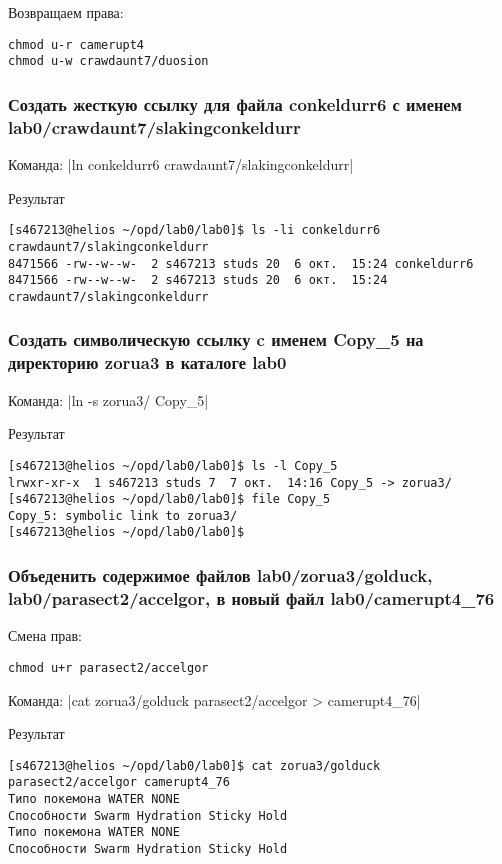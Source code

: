 Возвращаем права:
\begin{verbatim}
chmod u-r camerupt4
chmod u-w crawdaunt7/duosion
\end{verbatim}


\subsubsection*{Создать жесткую ссылку для файла conkeldurr6 с именем lab0/crawdaunt7/slakingconkeldurr}

Команда: |ln conkeldurr6 crawdaunt7/slakingconkeldurr|

Результат
\begin{verbatim}
[s467213@helios ~/opd/lab0/lab0]$ ls -li conkeldurr6 crawdaunt7/slakingconkeldurr
8471566 -rw--w--w-  2 s467213 studs 20  6 окт.  15:24 conkeldurr6
8471566 -rw--w--w-  2 s467213 studs 20  6 окт.  15:24 crawdaunt7/slakingconkeldurr
\end{verbatim}

\subsubsection*{Создать символическую ссылку c именем Copy\_5 на директорию zorua3 в каталоге lab0}
Команда: |ln -s zorua3/ Copy_5|

Результат
\begin{verbatim}
[s467213@helios ~/opd/lab0/lab0]$ ls -l Copy_5
lrwxr-xr-x  1 s467213 studs 7  7 окт.  14:16 Copy_5 -> zorua3/
[s467213@helios ~/opd/lab0/lab0]$ file Copy_5
Copy_5: symbolic link to zorua3/
[s467213@helios ~/opd/lab0/lab0]$
\end{verbatim}

\subsubsection*{Объеденить содержимое файлов lab0/zorua3/golduck, lab0/parasect2/accelgor, в новый файл lab0/camerupt4\_76}

Смена прав: 
\begin{verbatim}
chmod u+r parasect2/accelgor
\end{verbatim}

Команда: |cat zorua3/golduck parasect2/accelgor > camerupt4_76|

Результат
\begin{verbatim}
[s467213@helios ~/opd/lab0/lab0]$ cat zorua3/golduck parasect2/accelgor camerupt4_76
Типо покемона WATER NONE
Способности Swarm Hydration Sticky Hold
Типо покемона WATER NONE
Способности Swarm Hydration Sticky Hold
\end{verbatim}

